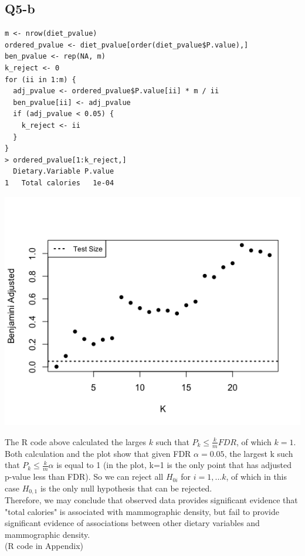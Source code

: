 \documentclass[11pt,letterpaper]{article}
\begin{document}
\subsection*{Q5-b}
\begin{verbatim}
m <- nrow(diet_pvalue)
ordered_pvalue <- diet_pvalue[order(diet_pvalue$P.value),]
ben_pvalue <- rep(NA, m)
k_reject <- 0
for (ii in 1:m) { 
  adj_pvalue <- ordered_pvalue$P.value[ii] * m / ii
  ben_pvalue[ii] <- adj_pvalue
  if (adj_pvalue < 0.05) {
    k_reject <- ii
  }
}
> ordered_pvalue[1:k_reject,]
  Dietary.Variable P.value
1   Total calories   1e-04
\end{verbatim}
\includegraphics[scale=0.6]{q5-b.png}

\noindent The R code above calculated the larges $k$ such that $P_k \leq \frac{k}{m} FDR$, of which $k = 1$.\\

\noindent Both calculation and the plot show that given FDR $\alpha = 0.05$, the largest k such that $P_{k} \leq \frac{k}{m} \alpha$ is equal to 1 (in the plot, k=1 is the only point that has adjusted p-value less than FDR). So we can reject all $H_{0i}$ for $i = 1, ... k$, of which in this case $H_{0,1}$ is the only null hypothesis that can be rejected.\\

\noindent Therefore, we may conclude that observed data provides significant evidence that "total calories" is associated with mammographic density, but fail to provide significant evidence of associations between other dietary variables and mammographic density. \\

\noindent (R code in Appendix)
\end{document}
